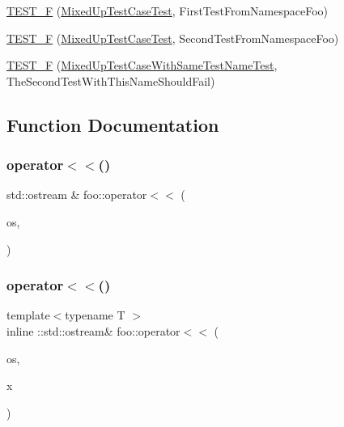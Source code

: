 \begin{DoxyCompactItemize}
\item 
\mbox{\hyperlink{namespacefoo_a0d50eecc97df56ae625078848ba9c98a}{T\+E\+S\+T\+\_\+F}} (\mbox{\hyperlink{classfoo_1_1_mixed_up_test_case_test}{Mixed\+Up\+Test\+Case\+Test}}, First\+Test\+From\+Namespace\+Foo)
\item 
\mbox{\hyperlink{namespacefoo_a7911fd62b6ae405016caed779b2f95dc}{T\+E\+S\+T\+\_\+F}} (\mbox{\hyperlink{classfoo_1_1_mixed_up_test_case_test}{Mixed\+Up\+Test\+Case\+Test}}, Second\+Test\+From\+Namespace\+Foo)
\item 
\mbox{\hyperlink{namespacefoo_a2bc2a2547ff38da0ecf68676e75583cd}{T\+E\+S\+T\+\_\+F}} (\mbox{\hyperlink{classfoo_1_1_mixed_up_test_case_with_same_test_name_test}{Mixed\+Up\+Test\+Case\+With\+Same\+Test\+Name\+Test}}, The\+Second\+Test\+With\+This\+Name\+Should\+Fail)
\end{DoxyCompactItemize}


\subsection{Function Documentation}
\mbox{\label{namespacefoo_a3b27f2298929aebc63bfe4b147b1e152}} 
\subsubsection{\texorpdfstring{operator$<$$<$()}{operator<<()}\hspace{0.1cm}{\footnotesize\ttfamily [1/2]}}
{\footnotesize\ttfamily std\+::ostream \& foo\+::operator$<$$<$ (\begin{DoxyParamCaption}\item[{\+::std\+::ostream \&}]{os,  }\item[{const \mbox{\hyperlink{structfoo_1_1_pointer_printable}{Pointer\+Printable}} $\ast$}]{ }\end{DoxyParamCaption})}

\mbox{\label{namespacefoo_abe04f604d114085b0b9af25600ef00da}} 
\subsubsection{\texorpdfstring{operator$<$$<$()}{operator<<()}\hspace{0.1cm}{\footnotesize\ttfamily [2/2]}}
{\footnotesize\ttfamily template$<$typename T $>$ \\
inline \+::std\+::ostream\& foo\+::operator$<$$<$ (\begin{DoxyParamCaption}\item[{\+::std\+::ostream \&}]{os,  }\item[{const \mbox{\hyperlink{classfoo_1_1_streamable_template_in_foo}{Streamable\+Template\+In\+Foo}}$<$ T $>$ \&}]{x }\end{DoxyParamCaption})}

